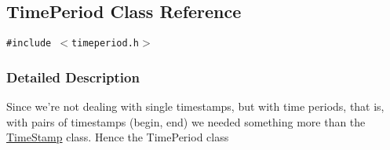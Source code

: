 \hypertarget{classTimePeriod}{
\subsection{Time\-Period Class Reference}
\label{classTimePeriod}
}
{\tt \#include $<$timeperiod.h$>$}



\subsubsection{Detailed Description}
Since we're not dealing with single timestamps, but with time periods, that is, with pairs of timestamps (begin, end) we needed something more than the \hyperlink{classTimeStamp}{Time\-Stamp} class. Hence the Time\-Period class 



